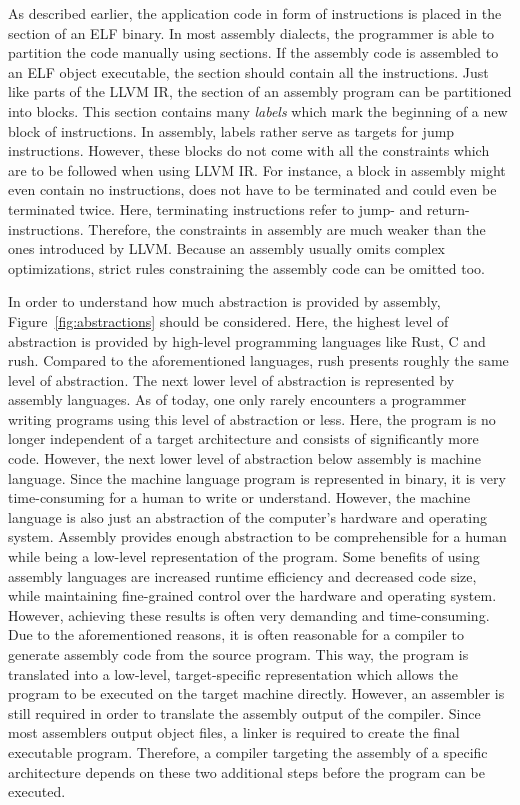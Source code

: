 As described earlier, the application code in form of instructions is placed in the  section of an ELF binary.
In most assembly dialects, the programmer is able to partition the code manually using sections.
If the assembly code is assembled to an ELF object executable, the  section should contain all the instructions.
Just like parts of the LLVM IR, the  section of an assembly program can be partitioned into blocks.
This section contains many \emph{labels} which mark the beginning of a new block of instructions.
In assembly, labels rather serve as targets for jump instructions.
However, these blocks do not come with all the constraints which are to be followed when using LLVM IR\@.
For instance, a block in assembly might even contain no instructions, does not have to be terminated and could even be terminated twice.
Here, terminating instructions refer to jump- and return-instructions.
Therefore, the constraints in assembly are much weaker than the ones introduced by LLVM\@.
Because an assembly usually omits complex optimizations, strict rules constraining the assembly code can be omitted too.

In order to understand how much abstraction is provided by assembly, Figure~\ref{fig:abstractions} should be considered.
Here, the highest level of abstraction is provided by high-level programming languages like Rust, C and rush.
Compared to the aforementioned languages, rush presents roughly the same level of abstraction.
The next lower level of abstraction is represented by assembly languages.
As of today, one only rarely encounters a programmer writing programs using this level of abstraction or less.
Here, the program is no longer independent of a target architecture and consists of significantly more code.
However, the next lower level of abstraction below assembly is machine language.
Since the machine language program is represented in binary, it is very time-consuming for a human to write or understand.
However, the machine language is also just an abstraction of the computer's hardware and operating system.
Assembly provides enough abstraction to be comprehensible for a human while being a low-level representation of the program.
Some benefits of using assembly languages are increased runtime efficiency and decreased code size, while maintaining fine-grained control over the hardware and operating system.
However, achieving these results is often very demanding and time-consuming.
Due to the aforementioned reasons, it is often reasonable for a compiler to generate assembly code from the source program.
This way, the program is translated into a low-level, target-specific representation which allows the program to be executed on the target machine directly.
However, an assembler is still required in order to translate the assembly output of the compiler.
Since most assemblers output object files, a linker is required to create the final executable program.
Therefore, a compiler targeting the assembly of a specific architecture depends on these two additional steps before the program can be executed.

